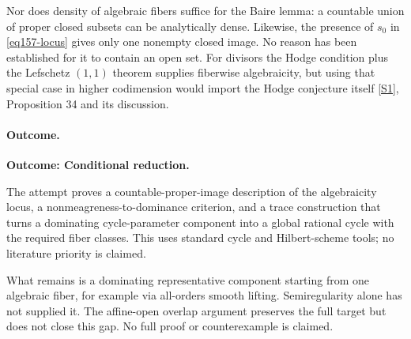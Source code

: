 \documentclass[11pt,a4paper]{article}
\newcommand{\sref}[2]{\hyperlink{source:#1:#2}{[S#2]}}
\numberwithin{equation}{section}
\begin{document}
Nor does density of algebraic fibers suffice for the Baire lemma: a
countable union of proper closed subsets can be analytically dense.
Likewise, the presence of $s_0$ in \eqref{eq157-locus} gives only one
nonempty closed image. No reason has been established for it to contain
an open set. For divisors the Hodge condition plus the Lefschetz
$(1,1)$ theorem supplies fiberwise algebraicity, but using that special
case in higher codimension would import the Hodge conjecture itself
\sref{statement}{1}, Proposition 34 and its discussion.

\paragraph{Outcome.}
\textbf{Outcome: Conditional reduction.}

The attempt proves a countable-proper-image description of the algebraicity
locus, a nonmeagreness-to-dominance criterion, and a trace construction that
turns a dominating cycle-parameter component into a global rational cycle
with the required fiber classes. This uses standard cycle and Hilbert-scheme
tools; no literature priority is claimed.

What remains is a dominating representative component starting from one
algebraic fiber, for example via all-orders smooth lifting. Semiregularity
alone has not supplied it. The affine-open overlap argument preserves the
full target but does not close this gap. No full proof or counterexample
is claimed.
\end{document}
